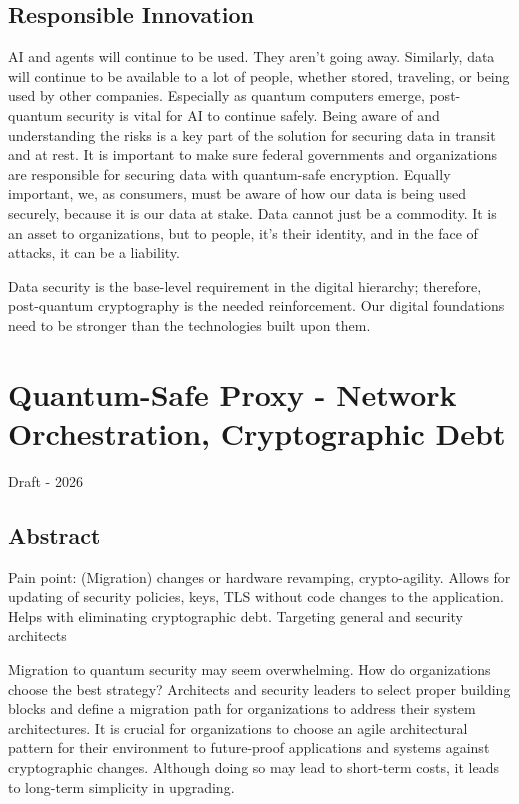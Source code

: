 \documentclass{article}
\begin{document}
\subsection{Responsible Innovation}

AI and agents will continue to be used. They aren’t going away. Similarly, data will continue to be available to a lot of people, whether stored, traveling, or being used by other companies. Especially as quantum computers emerge, post-quantum security is vital for AI to continue safely. Being aware of and understanding the risks is a key part of the solution for securing data in transit and at rest. It is important to make sure federal governments and organizations are responsible for securing data with quantum-safe encryption. Equally important, we, as consumers, must be aware of how our data is being used securely, because it is our data at stake. Data cannot just be a commodity. It is an asset to organizations, but to people, it’s their identity, and in the face of attacks, it can be a liability. 

Data security is the base-level requirement in the digital hierarchy; therefore, post-quantum cryptography is the needed reinforcement. Our digital foundations need to be stronger than the technologies built upon them. 



\clearpage
\section{Quantum-Safe Proxy - Network Orchestration, Cryptographic Debt}

Draft - 2026
\subsection{Abstract}

Pain point: (Migration) changes or hardware revamping, crypto-agility. Allows for updating of security policies, keys, TLS without code changes to the application. 
Helps with eliminating cryptographic debt. 
Targeting general and security architects

Migration to quantum security may seem overwhelming. How do organizations choose the best strategy? Architects and security leaders to select proper building blocks and define a migration path for organizations to address their system architectures. It is crucial for organizations to choose an agile architectural pattern for their environment to future-proof applications and systems against cryptographic changes. Although doing so may lead to short-term costs, it leads to long-term simplicity in upgrading. 
\end{document}
